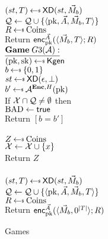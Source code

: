 \begin{figure}[tbhp]
\begin{center}
{\medskip
{}\\
$(st, T) \getsr \mdalg(st,\vmsg_b)$\\
$\mathcal{Q} \gets \mathcal{Q} \cup \{\langle \mathrm{pk},\vec{A},\vec{M}_b,T\rangle\}$\\
$R \getsr \mathrm{Coins}$\\
Return ${\mathsf{enc}}_{\mathrm{pk}}^{\vec{A}}(\langle \vec{M}_b,T\rangle; R)$\\
}
{
$\gamev{G3}{\advA}$\\
 $(\pk,\sk)\getsr\Kgen$\\
 $b \getsr \bits$ \\
 $st \getsr \mdalg(\epsilon,\bot)$\\
 $b' \getsr \advA^{\encOracle,H}(\pk)$\\
 If $\mathcal{X} \cap \mathcal{Q} \neq \emptyset$ then \\
\nudge $\mathrm{BAD} \gets\textsf{true}$\\
Return $[b=b']$\\ 

\medskip
{}\\
  $Z \getsr \mathrm{Coins}$\\
  $\mathcal{X} \gets \mathcal{X} \cup \{x\}$\\
  Return $Z$\\

\medskip
{}\\
$(st, T) \getsr \mdalg(st,\vmsg_b)$\\
$\mathcal{Q} \gets \mathcal{Q} \cup \{\langle \mathrm{pk},\vec{A},\vec{M}_b,T\rangle\}$\\
$R \getsr \mathrm{Coins}$\\
Return ${\mathsf{enc}}_{\mathrm{pk}}^{\vec{A}}(\langle \vec{M}_b,0^{|T|}\rangle; R)$\\
}
\caption{Games}
\label{fig:HtEgames}
\end{center}
\end{figure}

